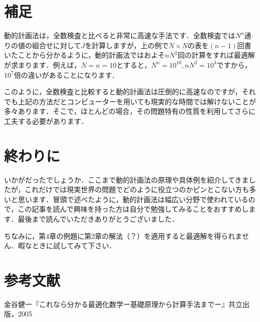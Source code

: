 \documentclass[a5paper]{jarticle}
\begin{document}
\section{補足}
動的計画法は，全数検査と比べると非常に高速な手法です．全数検査では$N^n$通りの値の組合せに対して$J$を計算しますが，上の例で$N \times N$の表を$(n - 1)$回書いたことから分かるように，動的計画法ではおよそ$nN^2$回の計算をすれば最適解が求まります．例えば，$N = n = 10$とすると，$N^n = 10^{10}, nN^2 = 10^3$ですから，$10^7$倍の違いがあることになります．

このように，全数検査と比較すると動的計画法は圧倒的に高速なのですが，それでも上記の方法だとコンピューターを用いても現実的な時間では解けないことが多々あります．そこで，ほとんどの場合，その問題特有の性質を利用してさらに工夫する必要があります．
\section{終わりに}
いかがだったでしょうか．ここまで動的計画法の原理や具体例を紹介してきましたが，これだけでは現実世界の問題でどのように役立つのかピンとこない方も多いと思います．冒頭で述べたように，動的計画法は幅広い分野で使われているので，この記事を読んで興味を持った方は自分で勉強してみることをおすすめします．最後まで読んでいただきありがとうございました．

ちなみに，第4章の例題に第2章の解法（？）を適用すると最適解を得られません．暇なときに試してみて下さい．
\section{参考文献}
金谷健一『これなら分かる最適化数学ー基礎原理から計算手法までー』共立出版，2005
\end{document}
